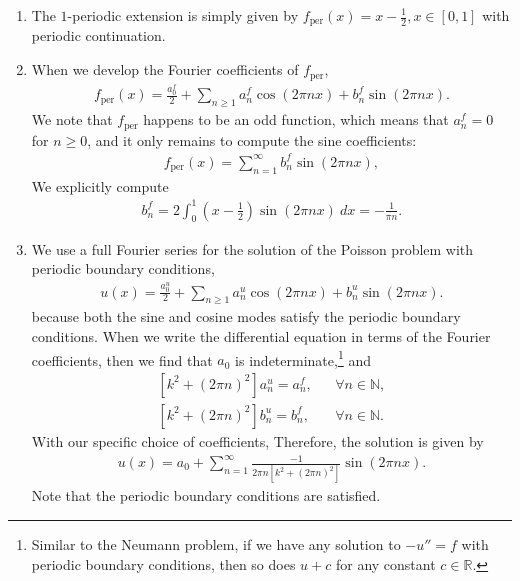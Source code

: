 \documentclass[11pt]{article}
\begin{document}
\begin{solution}
    \begin{enumerate}
        \item The $1$-periodic extension is simply given by $f_{\text{per}}(x) = x - \frac 1 2, x \in [0, 1]$ with periodic continuation.
        \item When we develop the Fourier coefficients of $f_{\text{per}}$, 
        \begin{align*}
            f_{\text{per}}(x) = \frac{a^{f}_0}{2} + \sum_{n \geq 1} a^{f}_{n} \cos( 2 \pi n x ) + b^{f}_{n} \sin( 2 \pi n x ).
        \end{align*}
        We note that $f_{\text{per}}$ happens to be an odd function, which means that $a^{f}_n = 0$ for $n \geq 0$,
        and it only remains to compute the sine coefficients:
        \begin{align*}
            f_{\text{per}}(x) = \sum_{n=1}^{\infty} b^{f}_n \sin(2 \pi n x),
        \end{align*}
        We explicitly compute 
        \begin{align*}
            b^{f}_n 
            = 
            2 \int_{0}^{1} \left( x- \frac 1 2 \right) \sin(2 \pi n x) \ dx 
            = 
            - \frac{1}{\pi n}
            .
        \end{align*}
        \item 
        We use a full Fourier series for the solution of the Poisson problem with periodic boundary conditions,
        \begin{align*}
            u(x) = \frac{a^{u}_0}{2} + \sum_{n \geq 1} a^{u}_{n} \cos( 2 \pi n x ) + b^{u}_{n} \sin( 2 \pi n x ).
        \end{align*}
        because both the sine and cosine modes satisfy the periodic boundary conditions. 
        When we write the differential equation in terms of the Fourier coefficients, then we find that $a_0$ is indeterminate,\footnote{Similar to the Neumann problem, if we have any solution to $-u'' = f$ with periodic boundary conditions, then so does $u+c$ for any constant $c \in \mathbb R$.} 
        and 
        \begin{align*}
            \left [k^2 + (2 \pi n)^2 \right] a^{u}_{n} = a^{f}_{n}, & & \forall n \in \mathbb{N}
            ,
            \\ 
            \left [k^2 + (2 \pi n)^2 \right] b^{u}_{n} = b^{f}_{n}, & & \forall n \in \mathbb{N}
            .
        \end{align*}
        With our specific choice of coefficients, 
        Therefore, the solution is given by
        \begin{align*}
            u(x) = a_0 + \sum_{n=1}^{\infty} \frac{-1}{2\pi n \left[k^2 + (2 \pi n)^2 \right]} \sin(2 \pi n x).
        \end{align*}
        Note that the periodic boundary conditions are satisfied.
    \end{enumerate}
\end{solution}



% 
\end{document}
